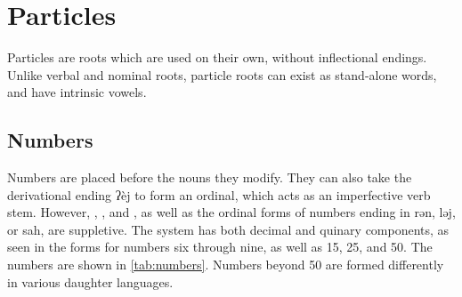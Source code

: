 \section{Particles}
Particles are roots which are used on their own, without inflectional endings.
Unlike verbal and nominal roots, particle roots can exist as stand-alone words,
and have intrinsic vowels.

\subsection{Numbers}
Numbers are placed before the nouns they modify. They can also take the
derivational ending {\ll ʔèj} to form an ordinal, which acts as an imperfective
verb stem. However, , , and , as well as the
ordinal forms of numbers ending in {\ll rən}, {\ll ləj}, or {\ll sah}, are
suppletive. The system has both decimal and quinary components, as seen in the
forms for numbers six through nine, as well as 15, 25, and 50. The numbers are
shown in \cref{tab:numbers}. Numbers beyond 50 are formed differently in
various daughter languages.

